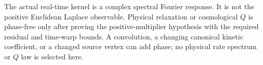 The actual real-time kernel is a complex spectral Fourier response.
It is not the positive Euclidean Laplace observable.  Physical relaxation
or cosmological $Q$ is phase-free only after proving the positive-multiplier
hypothesis with the required residual and time-warp bounds.  A convolution,
a changing canonical kinetic coefficient, or a changed source vertex can
add phase; no physical rate spectrum or $Q$ law is selected here.
